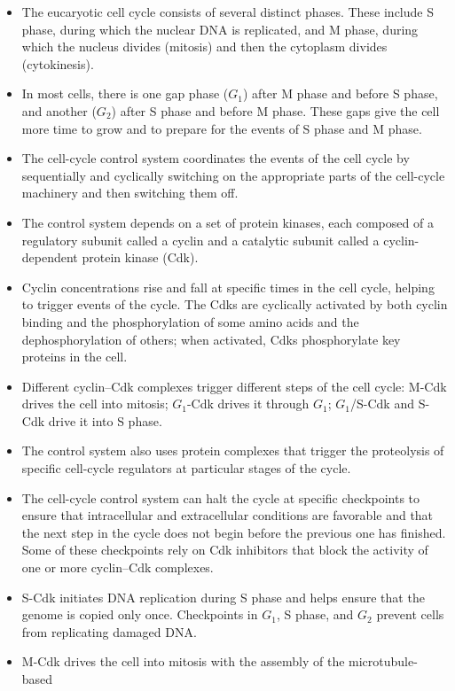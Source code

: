 \begin{itemize}
\item The eucaryotic cell cycle consists of several distinct phases. These
include S phase, during which the nuclear DNA is replicated, and M
phase, during which the nucleus divides (mitosis) and then the cytoplasm
divides (cytokinesis).
\item In most cells, there is one gap phase ($G_1$) after M phase and before
S phase, and another ($G_2$) after S phase and before M phase. These
gaps give the cell more time to grow and to prepare for the events of
S phase and M phase.
\item The cell-cycle control system coordinates the events of the cell cycle
by sequentially and cyclically switching on the appropriate parts of
the cell-cycle machinery and then switching them off.
\item The control system depends on a set of protein kinases, each composed
of a regulatory subunit called a cyclin and a catalytic subunit
called a cyclin-dependent protein kinase (Cdk).
\item Cyclin concentrations rise and fall at specific times in the cell cycle,
helping to trigger events of the cycle. The Cdks are cyclically activated
by both cyclin binding and the phosphorylation of some amino
acids and the dephosphorylation of others; when activated, Cdks
phosphorylate key proteins in the cell.
\item Different cyclin–Cdk complexes trigger different steps of the cell
cycle: M-Cdk drives the cell into mitosis; $G_1$-Cdk drives it through $G_1$;
$G_1$/S-Cdk and S-Cdk drive it into S phase.
\item The control system also uses protein complexes that trigger the proteolysis
of specific cell-cycle regulators at particular stages of the
cycle.
\item The cell-cycle control system can halt the cycle at specific checkpoints
to ensure that intracellular and extracellular conditions are favorable
and that the next step in the cycle does not begin before the previous
one has finished. Some of these checkpoints rely on Cdk inhibitors
that block the activity of one or more cyclin–Cdk complexes.
\item S-Cdk initiates DNA replication during S phase and helps ensure that
the genome is copied only once. Checkpoints in $G_1$, S phase, and $G_2$
prevent cells from replicating damaged DNA.
\item M-Cdk drives the cell into mitosis with the assembly of the microtubule-based

\end{itemize}
